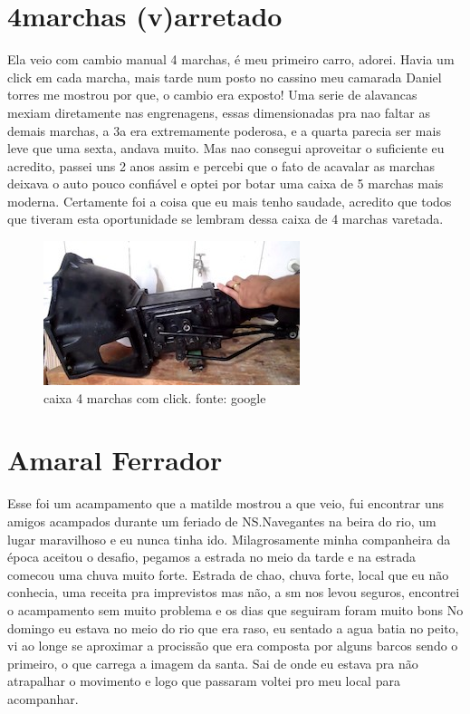 \documentclass[a4paper]{report}
\begin{document}
\section*{4marchas (v)arretado}

Ela veio com cambio manual 4 marchas, \'e meu primeiro carro, adorei. Havia um click em cada marcha,
mais tarde num posto no cassino meu camarada Daniel torres me mostrou por que, o cambio era exposto!
Uma serie de alavancas mexiam diretamente nas engrenagens, essas dimensionadas pra nao faltar as demais 
marchas, a 3a era extremamente poderosa, e a quarta parecia ser mais leve que uma sexta, andava muito. 
Mas nao consegui aproveitar o suficiente eu acredito, passei uns 2 anos assim e percebi que o fato de 
acavalar as marchas deixava o auto pouco confi\'avel e optei por botar uma caixa de 5 marchas mais 
moderna.
Certamente foi a coisa que eu mais tenho saudade, acredito que todos que tiveram esta oportunidade 
se lembram dessa caixa de 4 marchas varetada.

\begin{figure}[!htb]
\centering
\includegraphics{caixa4}
\caption{caixa 4 marchas com click. fonte: google}
\label{4 marchas opala varetada}
\end{figure}
\clearpage


\section*{Amaral Ferrador}

Esse foi um acampamento que a matilde mostrou a que veio, fui encontrar uns amigos acampados durante
um feriado de NS.Navegantes na beira do rio, um lugar maravilhoso e eu nunca tinha ido.
Milagrosamente minha companheira da \'epoca aceitou o desafio, pegamos a estrada no meio da tarde e 
na estrada comecou uma chuva muito forte.
Estrada de chao, chuva forte, local que eu n\~ao conhecia, uma receita pra imprevistos mas n\~ao,
a sm nos levou seguros, encontrei o acampamento sem muito problema e os dias que seguiram foram muito bons
No domingo eu estava no meio do rio que era raso, eu sentado a agua batia no peito, vi ao longe se aproximar
a prociss\~ao que era composta por alguns barcos sendo o primeiro, o que carrega a imagem da santa.
Sai de onde eu estava pra n\~ao atrapalhar o movimento e logo que passaram voltei pro meu local para acompanhar.
\end{document}
